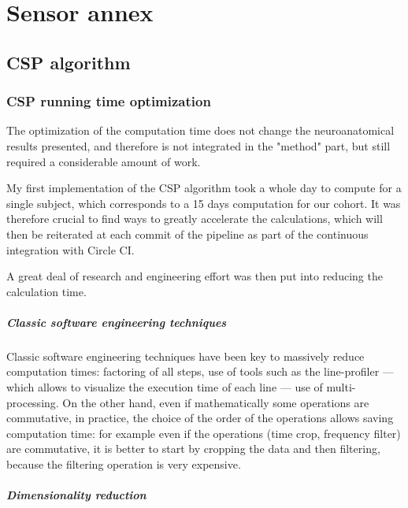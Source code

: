 
\chapter{Sensor annex}


\section{CSP algorithm}

\subsection{CSP running time optimization}
\label{Sec:running_time_optimisation}

The optimization of the computation time does not change the neuroanatomical results presented, and therefore is not integrated in the "method" part, but still required a considerable amount of work.

My first implementation of the CSP algorithm took a whole day to compute for a single subject, which corresponds to a 15 days computation for our cohort. It was therefore crucial to find ways to greatly accelerate the calculations, which will then be reiterated at each commit of the pipeline as part of the continuous integration with Circle CI.

A great deal of research and engineering effort was then put into reducing the calculation time.

\paragraph{Classic software engineering techniques}

Classic software engineering techniques have been key to massively reduce computation times: factoring of all steps, use of tools such as the line-profiler — which allows to visualize the execution time of each line —  use of multi-processing. On the other hand, even if mathematically some operations are commutative, in practice, the choice of the order of the operations allows saving computation time: for example even if the operations (time crop, frequency filter) are commutative, it is better to start by cropping the data and then filtering, because the filtering operation is very expensive.

\paragraph{Dimensionality reduction}


